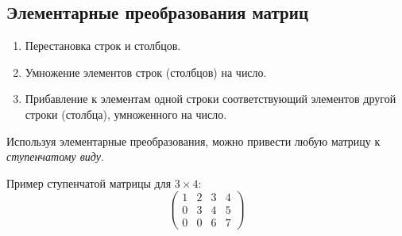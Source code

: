\subsection{Элементарные преобразования матриц}

\begin{enumerate}
  \item Перестановка строк и столбцов.
  \item Умножение элементов строк (столбцов) на число.
  \item Прибавление к элементам одной строки соответствующий элементов другой строки (столбца), умноженного на число.
\end{enumerate}

Используя элементарные преобразования, можно привести любую матрицу к \textit{ступенчатому виду}.
\begin{eg}
  Пример ступенчатой матрицы для $3 \times 4$:
  \[
  \begin{pmatrix}
    1 & 2 & 3 & 4 \\
    0 & 3 & 4 & 5 \\
    0 & 0 & 6 & 7
  \end{pmatrix}
  \] 
\end{eg}

